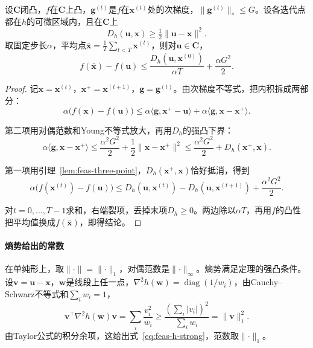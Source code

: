\begin{theorem}[镜像下降的平均点界]
\label{thm:feas-mirror-subgrad}
设$\bm{C}$闭凸，$f$在$\bm{C}$上凸，$\bm{g}^{(t)}$是$f$在$\bm{x}^{(t)}$处的次梯度，$\lVert\bm{g}^{(t)}\rVert_{*}\leq G$。设各迭代点都在$h$的可微区域内，且在$\bm{C}$上
\begin{equation}
 D_h(\bm{u},\bm{x})\geq\tfrac12\lVert\bm{u}-\bm{x}\rVert^2.
 \label{eq:feas-h-strong}
\end{equation}
取固定步长$\alpha$，平均点$\bar{\bm{x}}=\frac1T\sum_{t<T}\bm{x}^{(t)}$，则对$\bm{u}\in\bm{C}$，
\begin{equation}
 f(\bar{\bm{x}})-f(\bm{u})\leq\frac{D_h(\bm{u},\bm{x}^{(0)})}{\alpha T}+\frac{\alpha G^2}{2}.
 \label{eq:feas-mirror-rate}
\end{equation}
\end{theorem}

\begin{proof}
记$\bm{x}=\bm{x}^{(t)}$，$\bm{x}^{+}=\bm{x}^{(t+1)}$，$\bm{g}=\bm{g}^{(t)}$。由次梯度不等式，把内积拆成两部分：
\[
 \alpha\bigl(f(\bm{x})-f(\bm{u})\bigr)\leq\alpha\langle\bm{g},\bm{x}^{+}-\bm{u}\rangle+\alpha\langle\bm{g},\bm{x}-\bm{x}^{+}\rangle.
\]

第二项用对偶范数和Young不等式放大，再用$D_h$的强凸下界：
\[
 \alpha\langle\bm{g},\bm{x}-\bm{x}^{+}\rangle\leq\frac{\alpha^2G^2}{2}+\frac12\lVert\bm{x}-\bm{x}^{+}\rVert^2\leq\frac{\alpha^2G^2}{2}+D_h(\bm{x}^{+},\bm{x}).
\]

第一项用引理~\ref{lem:feas-three-point}，$D_h(\bm{x}^{+},\bm{x})$恰好抵消，得到
\[
 \alpha\bigl(f(\bm{x}^{(t)})-f(\bm{u})\bigr)\leq D_h(\bm{u},\bm{x}^{(t)})-D_h(\bm{u},\bm{x}^{(t+1)})+\frac{\alpha^2G^2}{2}.
\]

对$t=0,\ldots,T-1$求和，右端裂项，丢掉末项$D_h\geq0$。两边除以$\alpha T$，再用$f$的凸性把平均值换成$f(\bar{\bm{x}})$，即得结论。
\end{proof}

\paragraph{熵势给出的常数}
在单纯形上，取$\lVert\cdot\rVert=\lVert\cdot\rVert_1$，对偶范数是$\lVert\cdot\rVert_\infty$。熵势满足定理的强凸条件。设$\bm{v}=\bm{u}-\bm{x}$，$\bm{w}$是线段上任一点，$\nabla^2h(\bm{w})=\operatorname{diag}(1/w_i)$，由Cauchy--Schwarz不等式和$\sum_iw_i=1$，
\[
 \bm{v}^\top\nabla^2h(\bm{w})\bm{v}=\sum_i\frac{v_i^2}{w_i}\geq\frac{(\sum_i\lvert v_i\rvert)^2}{\sum_iw_i}=\lVert\bm{v}\rVert_1^2.
\]
由Taylor公式的积分余项，这给出式~\eqref{eq:feas-h-strong}，范数取$\lVert\cdot\rVert_1$。

